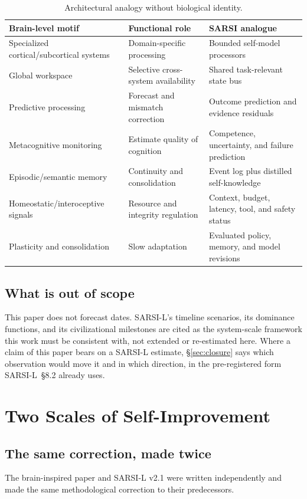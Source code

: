 \documentclass[11pt]{article}
\begin{document}
\begin{table}[t]
\centering\small
\caption{Architectural analogy without biological identity.}
\label{tab:analogy}
\begin{tabular}{p{4.0cm} p{4.6cm} p{6.2cm}}
\toprule
\textbf{Brain-level motif} & \textbf{Functional role} & \textbf{SARSI analogue} \\
\midrule
Specialized cortical/subcortical systems & Domain-specific processing & Bounded self-model processors \\
Global workspace & Selective cross-system availability & Shared task-relevant state bus \\
Predictive processing & Forecast and mismatch correction & Outcome prediction and evidence residuals \\
Metacognitive monitoring & Estimate quality of cognition & Competence, uncertainty, and failure prediction \\
Episodic/semantic memory & Continuity and consolidation & Event log plus distilled self-knowledge \\
Homeostatic/interoceptive signals & Resource and integrity regulation & Context, budget, latency, tool, and safety status \\
Plasticity and consolidation & Slow adaptation & Evaluated policy, memory, and model revisions \\
\bottomrule
\end{tabular}
\end{table}

\subsection{What is out of scope}
This paper does not forecast dates. SARSI-L's timeline scenarios, its dominance functions, and its civilizational milestones are cited as the system-scale framework this work must be consistent with, not extended or re-estimated here. Where a claim of this paper bears on a SARSI-L estimate, \S\ref{sec:closure} says which observation would move it and in which direction, in the pre-registered form SARSI-L~\S8.2 already uses.

\section{Two Scales of Self-Improvement}
\label{sec:scales}

\subsection{The same correction, made twice}
The brain-inspired paper and SARSI-L v2.1 were written independently and made the same methodological correction to their predecessors.
\end{document}
